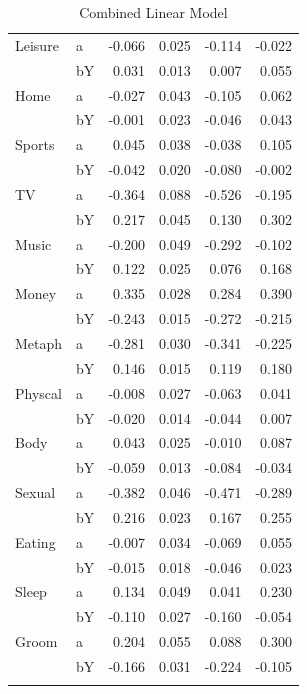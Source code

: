 \documentclass[11pt,a4paper]{article}
\begin{document}
\begin{longtable}{llrrrr}
Leisure & a & -0.066 &  0.025 &   -0.114 &    -0.022 \\
      & bY &  0.031 &  0.013 &    0.007 &     0.055 \\
Home & a & -0.027 &  0.043 &   -0.105 &     0.062 \\
      & bY & -0.001 &  0.023 &   -0.046 &     0.043 \\
Sports & a &  0.045 &  0.038 &   -0.038 &     0.105 \\
      & bY & -0.042 &  0.020 &   -0.080 &    -0.002 \\
TV & a & -0.364 &  0.088 &   -0.526 &    -0.195 \\
      & bY &  0.217 &  0.045 &    0.130 &     0.302 \\
Music & a & -0.200 &  0.049 &   -0.292 &    -0.102 \\
      & bY &  0.122 &  0.025 &    0.076 &     0.168 \\
Money & a &  0.335 &  0.028 &    0.284 &     0.390 \\
      & bY & -0.243 &  0.015 &   -0.272 &    -0.215 \\
Metaph & a & -0.281 &  0.030 &   -0.341 &    -0.225 \\
      & bY &  0.146 &  0.015 &    0.119 &     0.180 \\
Physcal & a & -0.008 &  0.027 &   -0.063 &     0.041 \\
      & bY & -0.020 &  0.014 &   -0.044 &     0.007 \\
Body & a &  0.043 &  0.025 &   -0.010 &     0.087 \\
      & bY & -0.059 &  0.013 &   -0.084 &    -0.034 \\
Sexual & a & -0.382 &  0.046 &   -0.471 &    -0.289 \\
      & bY &  0.216 &  0.023 &    0.167 &     0.255 \\
Eating & a & -0.007 &  0.034 &   -0.069 &     0.055 \\
      & bY & -0.015 &  0.018 &   -0.046 &     0.023 \\
Sleep & a &  0.134 &  0.049 &    0.041 &     0.230 \\
      & bY & -0.110 &  0.027 &   -0.160 &    -0.054 \\
Groom & a &  0.204 &  0.055 &    0.088 &     0.300 \\
      & bY & -0.166 &  0.031 &   -0.224 &    -0.105 \\
\bottomrule
\caption{Combined Linear Model}
\end{longtable}
\end{document}
